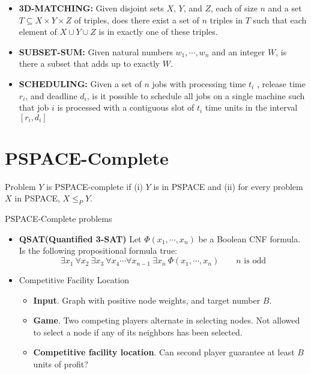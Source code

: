\documentclass{article}
\begin{document}
\begin{itemize}
    \item \textbf{3D-MATCHING: } Given disjoint sets $X$, $Y$, and $Z$, 
    each of size $n$ and a set $T \subseteq X \times Y \times Z$ of triples, 
    does there exist a set of $n$ triples in $T$ 
    such that each element of $X \cup Y \cup Z$ is in exactly one of these triples.
    \item \textbf{SUBSET-SUM: } Given natural numbers $w_1 , \cdots, w_n$ and an integer $W$, 
    is there a subset that adds up to exactly $W$.
    \item \textbf{SCHEDULING: } Given a set of $n$ jobs with processing time $t_i$ , 
    release time $r_i$, and deadline $d_i$, 
    is it possible to schedule all jobs on a single machine 
    such that job $i$ is processed with a contiguous slot of $t_i$ time units 
    in the interval $[r_i , d_i ]$
\end{itemize}

\section*{PSPACE-Complete}
Problem $Y$ is PSPACE-complete if (i) $Y$ is in PSPACE
and (ii) for every problem $X$ in PSPACE, $X \leq_P Y$. 

PSPACE-Complete problems
\begin{itemize}
    \item \textbf{QSAT(Quantified 3-SAT)} Let $\Phi(x_1 , \cdots, x_n )$ be a Boolean CNF formula.
    Is the following propositional formula true:
    \begin{equation*}
        \exists x_1 ~\forall x_2 ~\exists x_3 ~\forall x_4\cdots \forall x_{n-1} ~\exists x_n~\Phi(x_1,\cdots, x_n) \qquad n \text{ is odd}
    \end{equation*}
    \item Competitive Facility Location
    \begin{itemize}
        \item \textbf{Input}. Graph with positive node weights, and target number $B$.
        \item \textbf{Game}. Two competing players alternate in selecting nodes. 
        Not allowed to select a node if any of its neighbors has been selected.
        \item \textbf{Competitive facility location}. Can second player guarantee at least $B$
        units of profit?
    \end{itemize}
\end{itemize}
\end{document}
